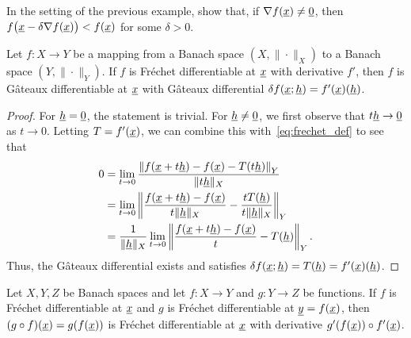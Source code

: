 \begin{problem}
In the setting of the previous example, show that, if $\nabla f (\underline{x}) \neq \underline{0}$, then $f\big(\underline{x}-\delta \nabla f(\underline{x})\big) < f(\underline{x})$ for some $\delta >0$.
\end{problem}

\begin{theorem}
Let $f \colon X \rightarrow Y$ be a mapping from a Banach space $(X,\|\cdot\|_X)$ to a Banach space $(Y,\|\cdot\|_Y)$.
If $f$ is Fr\'{e}chet differentiable at $\underline{x}$ with derivative $f'$, then $f$ is G\^{a}teaux differentiable at $\underline{x}$ with G\^{a}teaux differential $\delta f (\underline{x};\underline{h}) = f'(\underline{x}) (\underline{h})$.
\end{theorem}
\begin{proof}
For $\underline{h} = \underline{0}$, the statement is trivial.
For $\underline{h} \neq \underline{0}$, we first observe that $t\underline{h} \to \underline{0}$ as $t \to 0$.
Letting $T=f'(\underline{x})$, we can combine this with~\eqref{eq:frechet_def} to see that
\begin{align*}
0 &= \lim_{t \to 0} \frac{\left\|f(\underline{x}+ t\underline{h}) - f(\underline{x}) - T(t\underline{h}) \right\|_Y}{\| t\underline{h} \|_X} \\
&= \lim_{t \to 0} \left\|\frac{f(\underline{x}+ t\underline{h}) - f(\underline{x})}{t \| \underline{h} \|_X} - \frac{ t T(\underline{h})}{t \| \underline{h} \|_X} \right\|_Y \\
&= \frac{1}{\| \underline{h} \|_X}  \lim_{t \to 0} \left\|\frac{f(\underline{x}+ t\underline{h}) - f(\underline{x})}{t} - T(\underline{h}) \right\|_Y.
\end{align*}
Thus, the G\^{a}teaux differential exists and satisfies $\delta f (\underline{x};\underline{h}) = T (\underline{h}) = f'(\underline{x}) (\underline{h})$.
\end{proof}

\begin{theorem}
Let $X,Y,Z$ be Banach spaces and let $f \colon X \rightarrow Y$ and $g\colon Y \to Z$ be functions.
If $f$ is Fr\'{e}chet differentiable at $\underline{x}$ and $g$ is Fr\'{e}chet differentiable at $\underline{y}=f(\underline{x})$, then $(g \circ f) (\underline{x}) = g(f(\underline{x}))$ is Fr\'{e}chet differentiable at $\underline{x}$ with derivative $g'(f(\underline{x}))\circ f'(\underline{x})$.
\end{theorem}

